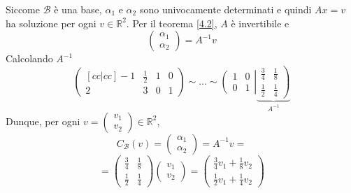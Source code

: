 \documentclass[a4paper]{article}
\theoremstyle{break}
\theoremstyle{break}
\theoremstyle{break}
\theoremstyle{break}
\begin{document}
\begin{example}
\[  \] 
  Siccome \( \mathcal{B} \) è una base, \( \alpha_1 \) e \( \alpha_2 \) sono univocamente
  determinati e quindi \( Ax = v \) ha soluzione per ogni \( v \in \mathbb{R}^2 \).
  Per il teorema \ref{4.2}, \( A \) è invertibile e
  \[
  \begin{pmatrix} 
    \alpha_1\\
    \alpha_2
  \end{pmatrix} 
  = A^{-1}v
  \] 
  Calcolando \( A^{-1} \) 
  \[
    \begin{pmatrix}[cc|cc]
      -1 & \frac{1}{2} & 1 & 0\\
      2 & 3 & 0 & 1
  \end{pmatrix} 
  \sim
  \ldots
  \sim
  \left(
  \begin{array}{cc}
    1 & 0\\
    0 & 1
  \end{array}
  \right|
  \underbrace{
    \left.
      \begin{array}{cc}
        \frac{3}{4} & \frac{1}{8}\\
        \frac{1}{2} & \frac{1}{4}
      \end{array}
    \right)
  }_{A^{-1}}
  \] 
  Dunque, per ogni \( v = \begin{pmatrix} v_1\\v_2 \end{pmatrix} \in \mathbb{R}^2 \),
  \[
    C_{\mathcal{B}}(v) = \begin{pmatrix} \alpha_1\\\alpha_2 \end{pmatrix} =
    A^{-1}v =
  \] 
  \[
    =
    \begin{pmatrix} 
      \frac{3}{4} & \frac{1}{8}\\
      \frac{1}{2} & \frac{1}{4}
    \end{pmatrix} 
    \begin{pmatrix} v_1\\v_2 \end{pmatrix} 
    =
    \begin{pmatrix} 
      \frac{3}{4}v_1 + \frac{1}{8}v_2\\
      \frac{1}{2}v_1 + \frac{1}{4}v_2
    \end{pmatrix} 
  \] 
\end{example}
\end{document}
